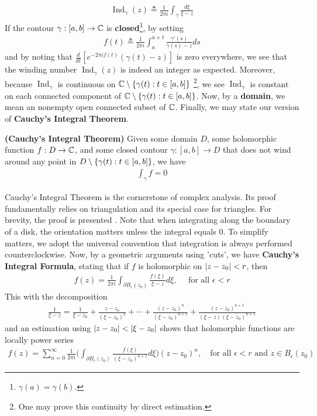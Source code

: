 \documentclass{report}
\begin{document}
\begin{align*}
\operatorname{Ind}_\gamma (z)\triangleq  \frac{1}{2\pi i}\int_\gamma \frac{d\xi}{\xi -z}
\end{align*}
If the contour $\gamma :[a,b]\rightarrow \mathbb{C}$ is \textbf{closed}\footnote{$\gamma  (a)=\gamma (b)$.}, by setting 
\begin{align*}
f(t)\triangleq  \frac{1}{2\pi i}\int_a^{a+t} \frac{\gamma '(s)}{\gamma (s)-z}ds
\end{align*}
and by noting that  $\frac{d}{dt}[e^{-2\pi  if(t)}(\gamma (t)-z)]$ is zero everywhere, we see that the winding number $\operatorname{Ind}_\gamma (z)$ is indeed an integer as expected. Moreover, because $\operatorname{Ind}_\gamma $ is continuous on $\mathbb{C} \setminus \{ \gamma (t):t \in [a,b] \}$ \footnote{One may prove this continuity by direct estimation.}, we see $\operatorname{Ind}_\gamma $ is constant on each connected component of $\mathbb{C} \setminus \{ \gamma (t):t \in [a,b] \}$. Now, by a \textbf{domain}, we mean an nonempty open connected subset of $\mathbb{C}$. Finally, we may state our version of \textbf{Cauchy's Integral Theorem}.  
\begin{theorem}
\textbf{(Cauchy's Integral Theorem)} Given some domain $D$, some holomorphic function $f:D\rightarrow \mathbb{C}$, and some closed contour $\gamma :[a,b]\rightarrow D$ that does not wind around any point in $D \setminus \{ \gamma (t):t \in [a,b] \}$, we have 
\begin{align*}
\int_\gamma f=0
\end{align*}
\end{theorem}
Cauchy's Integral Theorem is the cornerstone of complex analysis. Its proof fundamentally relies on triangulation and its special case for triangles. For brevity, the proof is presented . Note that when integrating along the boundary of a disk, the orientation matters unless the integral equals $0$. To simplify matters, we adopt the universal convention that integration is always performed counterclockwise. Now, by a geometric arguments using 'cuts', we have \textbf{Cauchy's Integral Formula}, stating that if $f$ is holomorphic on  $\left|z-z_0\right|<r$, then  
\begin{align*}
f(z)= \frac{1}{2\pi  i}\int_{\partial B_\epsilon (z_0) }\frac{f(\xi)}{\xi - z}d\xi,\quad\text{ for all }\epsilon <r
\end{align*}
This with the decomposition 
\begin{align}
\label{dexiz}
\frac{1}{\xi-z}= \frac{1}{\xi-z_0} + \frac{z-z_0}{(\xi -z_0)^2} + \cdots + \frac{(z-z_0)^n}{(\xi-z_0)^{n+1}}+  \frac{(z-z_0)^{n+1}}{(\xi-z)(\xi-z_0)^{n+1}}
\end{align}
and an estimation using $\left|z-z_0\right| < \left|\xi-z_0\right|$ shows that holomorphic functions are locally power series 
\begin{align*}
f(z)= \sum_{n=0}^{\infty} \frac{1}{2\pi i}\Big(\int_{\partial B_\epsilon (z_0)} \frac{f(\xi)}{(\xi- z_0)^{n+1}}d\xi \Big) (z-z_0)^{n},\quad\text{for all }\epsilon <r \text{ and }z\in B_\epsilon (z_0)
\end{align*}
\end{document}
